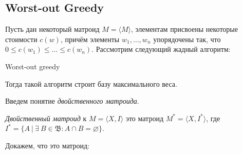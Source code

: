 \subsection{Worst-out Greedy}

\begin{Lemma}
  Пусть дан некоторый матроид $M = \langle M \rangle$, элементам присвоены
  некоторые стоимости $c(w)$, причём элементы $w_1, \ldots, w_n$ упорядочены
  так, что $0 \leqslant c(w_1) \leqslant \ldots \leqslant c(w_n)$. Рассмотрим
  следующий жадный алгоритм:

  \begin{algorithm}
  \caption{Worst-out greedy}
    \begin{algorithmic}[1]
        \EndIf
      \EndFor
    \end{algorithmic}
\end{algorithm}

Тогда такой алгоритм строит базу максимального веса.
\end{Lemma}

  Введем понятие {\it двойственного матроида}.

{\it Двойственный матроид} к $M = \langle X, I \rangle$ это матроид $M^* = 
\langle X, I^*\rangle$, где $I^* = \{A \ | \ \exists \ B \in \mathfrak{B} : A
\cap B = \varnothing\}$.

Докажем, что это матроид:

